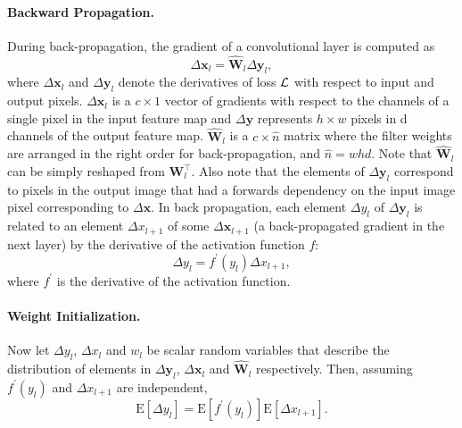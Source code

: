 \documentclass[thesis]{subfiles}
\begin{document}
    \paragraph{Backward Propagation.}
    During back-propagation, the gradient of a convolutional layer is computed as
    \begin{equation}
    \Delta \mathbf{x}_l = \hat{\mathbf{W}}_l \Delta \mathbf{y}_l,
    \label{eq:back_prop_gradient}
    \end{equation}
    where $\Delta \mathbf{x}_l$ and $\Delta \mathbf{y}_l$ denote the derivatives of loss $\cal L$ with respect to input and output pixels. $\Delta \mathbf{x}_l$ is a $c \times 1$ vector of gradients with respect to the channels of a single pixel in the input feature map and $\Delta \mathbf{y}$ represents $h \times w$ pixels in d channels of the output feature map. $\hat{\mathbf{W}}_l$ is a $c \times \hat{n}$ matrix where the filter weights are arranged in the right order for back-propagation, and $\hat{n} = whd$. Note that $\hat{\mathbf{W}}_l$ can be simply reshaped from $\mathbf{W}_l^\top$. Also note that the elements of $\Delta \mathbf{y}_l$ correspond to pixels in the output image that had a forwards dependency on the input image pixel corresponding to $\Delta \mathbf{x}$. In back propagation, each element $\Delta y_l$ of $\Delta \mathbf{y}_l$ is related to an element $\Delta x_{l+1}$ of some $\Delta \mathbf{x}_{l+1}$ (\ie a back-propagated gradient in the next layer) by the derivative of the activation function $f$:
    \begin{equation}
    \Delta y_l = f^\prime (y_l) \Delta x_{l+1},
    \end{equation}
    where $f^\prime$ is the derivative of the activation function. 
    
    
    \newcommand{\Expect}{\mathrm{E}}
    \newcommand{\Var}{\mathrm{Var}}
    
    \paragraph{Weight Initialization.}
    Now let $\Delta y_l$, $\Delta x_l$ and $w_l$ be scalar random variables that describe the distribution of elements in $\Delta \mathbf{y}_l$, $\Delta \mathbf{x}_{l}$ and $\hat{\mathbf{W}}_l$ respectively. Then, assuming $f^\prime (y_l)$ and $\Delta x_{l+1}$ are independent,
    \begin{equation}
    \Expect[\Delta y_l] = \Expect[f^\prime (y_l)] \Expect[ \Delta x_{l+1}].
    \end{equation}
    
\end{document}
